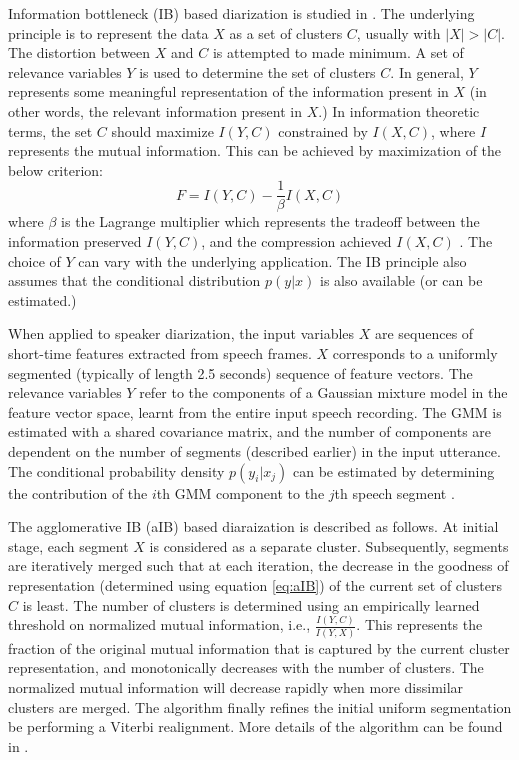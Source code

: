 \documentclass[conference]{IEEEtran}
\begin{document}
Information bottleneck (IB) based diarization is studied in
\cite{deepuThesis}. The underlying principle is to represent the data $X$ as a
set of clusters $C$, usually with $|X|>|C|$. The distortion between $X$ and $C$
is attempted to made minimum. A set of relevance variables $Y$ is used to
determine the set of clusters $C$. In general, $Y$ represents some meaningful
representation of the information present in $X$ (in other words, the relevant
information present in $X$.) In information theoretic terms, the set $C$ 
should maximize $I(Y,C)$ constrained by
$I(X,C)$, where $I$ represents the mutual information. This can be achieved by
maximization of the below criterion:
\begin{equation}
\label{eq:aIB}
F = I(Y,C) - \frac{1}{\beta}I(X,C) 
\end{equation}
where $\beta$ is the Lagrange multiplier which represents the tradeoff between
the information preserved $I(Y,C)$, and the compression achieved $I(X,C)$
\cite{deepuThesis}. The choice of $Y$ can vary with the underlying
application. The IB principle also assumes that the conditional distribution
$p(y|x)$ is also available (or can be estimated.)

When applied to speaker diarization, the input variables $X$ are sequences of
short-time features extracted from speech frames. $X$ corresponds to a uniformly
segmented (typically of length 2.5 seconds) sequence of feature vectors. The
relevance variables $Y$ refer to the components of a Gaussian mixture model in
the feature vector space, learnt from the entire input speech recording. The GMM is
estimated with a shared covariance matrix, and the number of components are
dependent on the number of segments (described earlier) in the input utterance.
The conditional probability density $p(y_i|x_j)$ can be estimated by determining
the contribution of the $i$th GMM component to the $j$th speech segment
\cite{deepuThesis}.

The agglomerative IB (aIB) based diaraization is described as follows. At
initial stage, each segment $X$ is
considered as a separate cluster. Subsequently, segments are iteratively merged such that 
at each iteration, the decrease in the goodness of representation (determined using 
equation \ref{eq:aIB}) of the current set of clusters $C$ is least. The number of 
clusters is determined using an empirically learned threshold on normalized mutual 
information, i.e., $\frac{I(Y,C)}{I(Y,X)}$. This represents the 
fraction of the original mutual information that is captured by the current cluster
representation, and monotonically decreases with the number of clusters.  The
normalized mutual information will decrease rapidly when more dissimilar clusters are merged. The
algorithm finally refines the initial uniform segmentation be performing a
Viterbi realignment. More details of the algorithm 
can be found in \cite{deepuThesis}.
\end{document}
